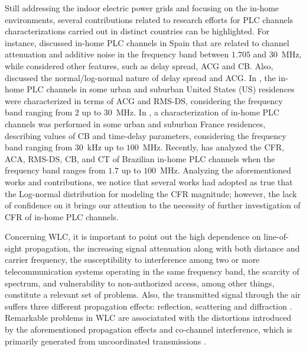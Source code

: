 Still addressing the indoor electric power grids and focusing on the in-home environments, several contributions related to research efforts for \ac{PLC} channels characterizations carried out in distinct countries can be highlighted. For instance, \cite{Canete:Model} discussed in-home \ac{PLC} channels in Spain that are related to channel attenuation and additive noise in the frequency band between $1.705$ and $30$~MHz, while \cite{Canete:PLC} considered other features, such as delay spread, \ac{ACG} and \ac{CB}. Also, \cite{Cortes:PLC} discussed the normal/log-normal nature of delay spread and \ac{ACG}. In \cite{GalliUS,Galli:Wireline}, the in-home \ac{PLC} channels in some urban and suburban United States (US) residences were characterized in terms of \ac{ACG} and \ac{RMS-DS}, considering the frequency band ranging from $2$ up to $30$~MHz. In \cite{Tlich:Indoor}, a characterization of in-home \ac{PLC} channels was performed in some urban and suburban France residences, describing values of \ac{CB} and time-delay parameters, considering the frequency band ranging from $30$~kHz up to $100$~MHz. Recently, \cite{Thiago:Characterization} has analyzed the \ac{CFR}, \ac{ACA}, \ac{RMS-DS}, \ac{CB}, and \ac{CT} of Brazilian in-home \ac{PLC} channels when the frequency band ranges from $1.7$ up to $100$~MHz. Analyzing the aforementioned works and contributions, we notice that several works had adopted as true that the Log-normal distribution for modeling the \ac{CFR} magnitude; however, the lack of confidence on it \cite{Cortes:PLC} brings our attention to the necessity of further investigation of \ac{CFR} of in-home \ac{PLC} channels.

Concerning \ac{WLC}, it is important to point out the high dependence on line-of-sight propagation, the increasing signal attenuation along with both distance and carrier frequency, the susceptibility to interference among two or more telecommunication systems operating in the same frequency band, the scarcity of spectrum, and vulnerability to non-authorized access, among other things, constitute a relevant set of problems. Also, the transmitted signal through the air suffers three different propagation effects: reflection, scattering and diffraction \cite{Guze}. Remarkable problems in \ac{WLC} are associatated with the distortions introduced by the aforementioned propagation effects and co-channel interference, which is primarily generated from uncoordinated transmissions \cite{Sayed2015}.  

